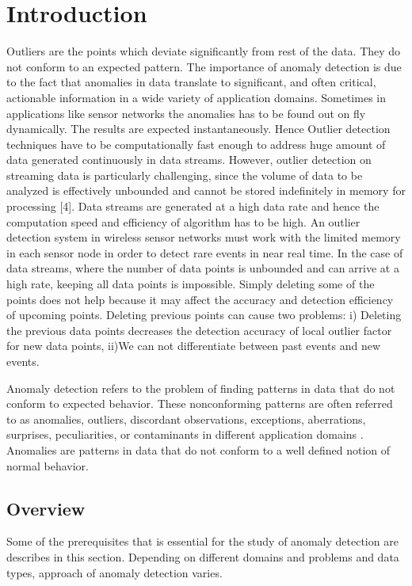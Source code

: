 \chapter{Introduction}

Outliers are the points which deviate significantly from rest of the data. They do not conform to an expected pattern. The importance of anomaly detection is due to the fact that anomalies in data translate
to significant, and often critical, actionable information in a wide variety of application
domains. Sometimes in applications like sensor networks the anomalies has to be found out on fly dynamically. The results are expected instantaneously. Hence Outlier detection techniques have to be computationally fast enough to address huge amount of data generated continuously in data streams. 
	 However, outlier detection on streaming data is particularly
challenging, since the volume of data to be analyzed is
effectively unbounded and cannot be stored indefinitely in
memory for processing [4]. Data streams are generated at a high data rate and hence the computation speed and efficiency of algorithm has to be high. An outlier detection system in wireless sensor
networks must work with the limited memory in each
sensor node in order to detect rare events in near real time. In the
case of data streams, where the number of data points is
unbounded and can arrive at a high rate, keeping all data
points is impossible. Simply deleting some of the points does not help because it may affect the accuracy and detection efficiency of upcoming points. Deleting previous points can cause two problems: i) Deleting the previous data points decreases the detection accuracy of local outlier factor for new data points, ii)We can not differentiate between past events and new events. 


Anomaly detection refers to the problem of finding patterns in data that do not conform
to expected behavior. These nonconforming patterns are often referred to as anomalies,
outliers, discordant observations, exceptions, aberrations, surprises, peculiarities, or contaminants in different application domains \cite{a}. Anomalies are patterns in data that do not conform to a well defined notion of normal
behavior.

\section{Overview}

Some of the prerequisites that is essential for the study of anomaly detection are describes in this section. Depending on different domains and problems and data types, approach of anomaly detection varies. 
